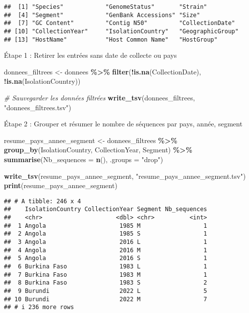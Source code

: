 \documentclass[
]{article}
\newenvironment{Shaded}{\begin{snugshade}}{\end{snugshade}}
\newcommand{\AttributeTok}[1]{\textcolor[rgb]{0.13,0.29,0.53}{#1}}
\newcommand{\CommentTok}[1]{\textcolor[rgb]{0.56,0.35,0.01}{\textit{#1}}}
\newcommand{\FunctionTok}[1]{\textcolor[rgb]{0.13,0.29,0.53}{\textbf{#1}}}
\newcommand{\NormalTok}[1]{#1}
\newcommand{\OtherTok}[1]{\textcolor[rgb]{0.56,0.35,0.01}{#1}}
\newcommand{\SpecialCharTok}[1]{\textcolor[rgb]{0.81,0.36,0.00}{\textbf{#1}}}
\newcommand{\StringTok}[1]{\textcolor[rgb]{0.31,0.60,0.02}{#1}}
\begin{document}
\begin{verbatim}
##  [1] "Species"            "GenomeStatus"       "Strain"            
##  [4] "Segment"            "GenBank Accessions" "Size"              
##  [7] "GC Content"         "Contig N50"         "CollectionDate"    
## [10] "CollectionYear"     "IsolationCountry"   "GeographicGroup"   
## [13] "HostName"           "Host Common Name"   "HostGroup"
\end{verbatim}

Étape 1 : Retirer les entrées sans date de collecte ou pays

\begin{Shaded}
\begin{Highlighting}[]
\NormalTok{donnees\_filtrees }\OtherTok{\textless{}{-}}\NormalTok{ donnees }\SpecialCharTok{\%\textgreater{}\%}
  \FunctionTok{filter}\NormalTok{(}\SpecialCharTok{!}\FunctionTok{is.na}\NormalTok{(CollectionDate), }\SpecialCharTok{!}\FunctionTok{is.na}\NormalTok{(IsolationCountry))}

\CommentTok{\# Sauvegarder les données filtrées}
\FunctionTok{write\_tsv}\NormalTok{(donnees\_filtrees, }\StringTok{"donnees\_filtrees.tsv"}\NormalTok{)}
\end{Highlighting}
\end{Shaded}

Étape 2 : Grouper et résumer le nombre de séquences par pays, année,
segment

\begin{Shaded}
\begin{Highlighting}[]
\NormalTok{resume\_pays\_annee\_segment }\OtherTok{\textless{}{-}}\NormalTok{ donnees\_filtrees }\SpecialCharTok{\%\textgreater{}\%}
  \FunctionTok{group\_by}\NormalTok{(IsolationCountry, CollectionYear, Segment) }\SpecialCharTok{\%\textgreater{}\%}
  \FunctionTok{summarise}\NormalTok{(}\AttributeTok{Nb\_sequences =} \FunctionTok{n}\NormalTok{(), }\AttributeTok{.groups =} \StringTok{"drop"}\NormalTok{)}

\FunctionTok{write\_tsv}\NormalTok{(resume\_pays\_annee\_segment, }\StringTok{"resume\_pays\_annee\_segment.tsv"}\NormalTok{)}
\FunctionTok{print}\NormalTok{(resume\_pays\_annee\_segment)}
\end{Highlighting}
\end{Shaded}

\begin{verbatim}
## # A tibble: 246 x 4
##    IsolationCountry CollectionYear Segment Nb_sequences
##    <chr>                     <dbl> <chr>          <int>
##  1 Angola                     1985 M                  1
##  2 Angola                     1985 S                  1
##  3 Angola                     2016 L                  1
##  4 Angola                     2016 M                  1
##  5 Angola                     2016 S                  1
##  6 Burkina Faso               1983 L                  1
##  7 Burkina Faso               1983 M                  1
##  8 Burkina Faso               1983 S                  2
##  9 Burundi                    2022 L                  5
## 10 Burundi                    2022 M                  7
## # i 236 more rows
\end{verbatim}
\end{document}
